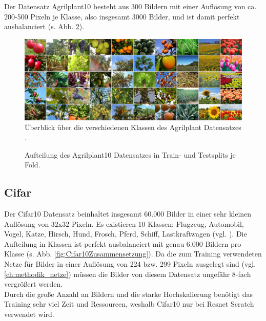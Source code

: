 Der Datensatz Agrilplant10 besteht aus 300 Bildern mit einer Auflösung von ca. 200-500 Pixeln je Klasse, also insgesamt 3000 Bilder, und ist damit perfekt ausbalanciert (s. Abb. \ref{fig:Agrilplant10Zusammensetzung}).\\

\begin{figure}[H]
\includegraphics[scale=0.2]{img/2_agrilplant-image.jpg}
\caption{Überblick über die verschiedenen Klassen des Agrilplant Datensatzes \cite{pawaraAgrilplant}.}
\label{fig:agrilplantUeberblick}
\end{figure}

\begin{figure}[H]
\begin{adjustbox}{width=1.1\textwidth, center}

\end{adjustbox}
\caption{Aufteilung des Agrilplant10 Datensatzes \cite{pawaraWebsiteDatensaetze} in Train- und Testsplits je Fold.}
\label{fig:Agrilplant10Zusammensetzung}
\end{figure}


\subsection{Cifar}
\label{ch:methodik_datensaetzeCifar10}
Der Cifar10 Datensatz beinhaltet insgesamt 60.000 Bilder in einer sehr kleinen Auflösung von 32x32 Pixeln. Es existieren 10 Klassen: Flugzeug, Automobil, Vogel, Katze, Hirsch, Hund, Frosch, Pferd, Schiff, Lastkraftwagen (vgl. \cite{cifar10}).
Die Aufteilung in Klassen ist perfekt ausbalanciert mit genau 6.000 Bildern pro Klasse (s. Abb. \ref{fig:Cifar10Zusammensetzung}).
Da die zum Training verwendeten Netze für Bilder in einer Auflösung von 224 bzw. 299 Pixeln ausgelegt sind (vgl. \ref{ch:methodik_netze}) müssen die Bilder von diesem Datensatz ungefähr 8-fach vergrößert werden.\\

Durch die große Anzahl an Bildern und die starke Hochskalierung benötigt das Training sehr viel Zeit und Ressourcen, weshalb Cifar10 nur bei Resnet Scratch verwendet wird.

